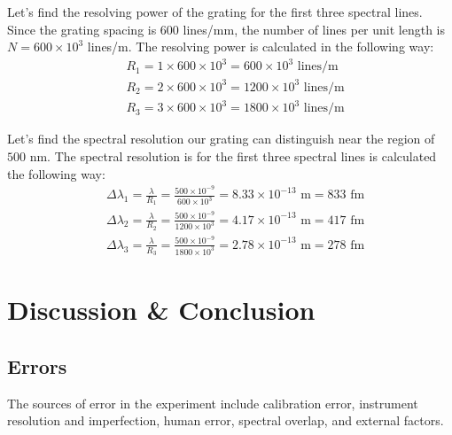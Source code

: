 \documentclass[10pt]{article}
\begin{document}
Let's find the resolving power of the grating for the first three spectral lines. Since the grating spacing is $600$ lines/mm, the number of lines per unit length is $N = 600 \times 10^3$ lines/m. The resolving power is calculated in the following way:
\begin{align}
  &R_1 = 1 \times 600 \times 10^3 = 600 \times 10^3 \text{ lines/m} \\
  &R_2 = 2 \times 600 \times 10^3 = 1200 \times 10^3 \text{ lines/m} \\
  &R_3 = 3 \times 600 \times 10^3 = 1800 \times 10^3 \text{ lines/m}
\end{align}

Let's find the spectral resolution our grating can distinguish near the region of $500$ nm. The spectral resolution is for the first three spectral lines is calculated the following way:
\begin{align}
  &\Delta \lambda_1 = \frac{\lambda}{R_1} = \frac{500 \times 10^{-9}}{600 \times 10^3} = 8.33 \times 10^{-13} \text{ m} = 833 \text{ fm} \\
  &\Delta \lambda_2 = \frac{\lambda}{R_2} = \frac{500 \times 10^{-9}}{1200 \times 10^3} = 4.17 \times 10^{-13} \text{ m} = 417 \text{ fm} \\
  &\Delta \lambda_3 = \frac{\lambda}{R_3} = \frac{500 \times 10^{-9}}{1800 \times 10^3} = 2.78 \times 10^{-13} \text{ m} = 278 \text{ fm}
\end{align}

\section{Discussion \& Conclusion}

\subsection*{Errors}

The sources of error in the experiment include calibration error, instrument resolution and imperfection, human error, spectral overlap, and external factors.
\end{document}
